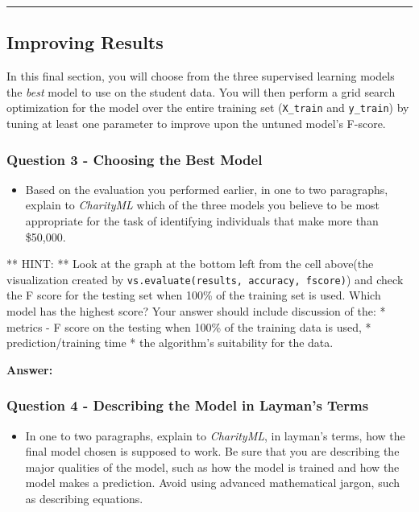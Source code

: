 \documentclass[11pt]{article}
\providecommand{\tightlist}{%
      \setlength{\itemsep}{0pt}\setlength{\parskip}{0pt}}
\begin{document}
    \begin{center}\rule{0.5\linewidth}{\linethickness}\end{center}

\subsection{Improving Results}\label{improving-results}

In this final section, you will choose from the three supervised
learning models the \emph{best} model to use on the student data. You
will then perform a grid search optimization for the model over the
entire training set (\texttt{X\_train} and \texttt{y\_train}) by tuning
at least one parameter to improve upon the untuned model's F-score.

    \subsubsection{Question 3 - Choosing the Best
Model}\label{question-3---choosing-the-best-model}

\begin{itemize}
\tightlist
\item
  Based on the evaluation you performed earlier, in one to two
  paragraphs, explain to \emph{CharityML} which of the three models you
  believe to be most appropriate for the task of identifying individuals
  that make more than \$50,000.
\end{itemize}

** HINT: ** Look at the graph at the bottom left from the cell above(the
visualization created by
\texttt{vs.evaluate(results,\ accuracy,\ fscore)}) and check the F score
for the testing set when 100\% of the training set is used. Which model
has the highest score? Your answer should include discussion of the: *
metrics - F score on the testing when 100\% of the training data is
used, * prediction/training time * the algorithm's suitability for the
data.

    \textbf{Answer: }

    \subsubsection{Question 4 - Describing the Model in Layman's
Terms}\label{question-4---describing-the-model-in-laymans-terms}

\begin{itemize}
\tightlist
\item
  In one to two paragraphs, explain to \emph{CharityML}, in layman's
  terms, how the final model chosen is supposed to work. Be sure that
  you are describing the major qualities of the model, such as how the
  model is trained and how the model makes a prediction. Avoid using
  advanced mathematical jargon, such as describing equations.
\end{itemize}
\end{document}
